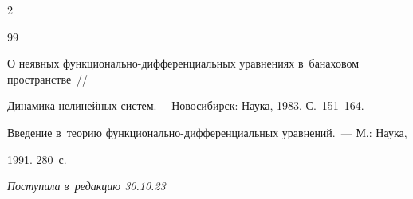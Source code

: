 \begin{multicols}{2}
{{\begin{thebibliography}{99}



 О неявных функ\-ци\-о\-наль\-но-диф\-фе\-рен\-ци\-аль\-ных уравнениях в~банаховом пространстве~// 

Динамика нелинейных сис\-тем.~-- Новосибирск: Наука, 1983. С.~151--164.






Введение в~тео\-рию функ\-ци\-о\-наль\-но-диф\-фе\-рен\-ци\-аль\-ных уравнений.~--- М.: Наука,  

1991. 280~с.

\end{thebibliography}



 }

 }



\end{multicols}



\vspace*{-9pt}



\hfill{\small\textit{Поступила в~редакцию 30.10.23}}









\newpage



\vspace*{-28pt}
















\def\tit{CONDITIONALLY OPTIMAL FILTERING IN~STOCHASTIC SYSTEMS WITH~RANDOM PARAMETERS AND~UNSOLVED DERIVATIVES}





